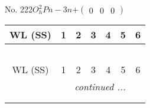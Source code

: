 \documentclass[fleqn,9pt,landscape]{jsarticle}
\begin{document}
\begin{center}
\begin{longtable}{ccccccc}
\end{longtable}
\end{center}
\newpage
No. 222\quad$O_{h}^{2}$\quad$Pn-3n$\quad[ cubic ]\quad$+\begin{pmatrix} 0 & 0 & 0 \end{pmatrix}$
\begin{center}
\renewcommand{\arraystretch}{1.2}
\begin{longtable}{ccccccc}
 \hline \hline
WL (SS) & 1 & 2 & 3 & 4 & 5 & 6 \\ \hline \endfirsthead

\multicolumn{6}{l}{\tablename\ \thetable{}} \\
 \hline \hline
WL (SS) & 1 & 2 & 3 & 4 & 5 & 6 \\ \hline \endhead

 \hline \hline
\multicolumn{6}{r}{\footnotesize\it continued ...} \\ \endfoot

 \hline \hline
\multicolumn{6}{r}{} \\ \endlastfoot


\end{longtable}
\end{center}
\end{document}
